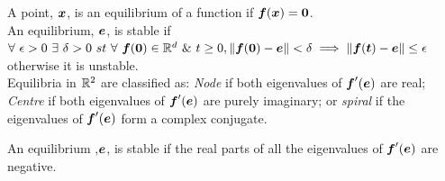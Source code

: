 \documentclass[11pt,a4paper]{article}
\begin{document}
\subtitle{Theory}
A point, $\boldsymbol{x}$, is an equilibrium of a function if $\boldsymbol{f}(\boldsymbol{x}) = \boldsymbol{0}$.\\
An equilibrium, $\boldsymbol{e}$, is stable if\\
\-\hspace{2em} $\forall\ \epsilon > 0\ \exists\ \delta > 0\ st\ \forall\ \boldsymbol{f}(\boldsymbol{0}) \in \mathbb{R}^d\ \&\ t \geq 0, \|\boldsymbol{f}(\boldsymbol{0}) - \boldsymbol{e}\| < \delta \implies \|\boldsymbol{f}(\boldsymbol{t}) - \boldsymbol{e}\| \leq \epsilon$\\
otherwise it is unstable.\\
Equilibria in $\mathbb{R}^2$ are classified as:
\-\hspace{2em} \textit{Node} if both eigenvalues of $\boldsymbol{f}'(\boldsymbol{e})$ are real;
\-\hspace{2em} \textit{Centre} if both eigenvalues of $\boldsymbol{f}'(\boldsymbol{e})$ are purely imaginary; or
\-\hspace{2em} \textit{spiral} if the eigenvalues of $\boldsymbol{f}'(\boldsymbol{e})$ form a complex conjugate.\\

\subtitle{Process}
An equilibrium ,$\boldsymbol{e}$, is stable if the real parts of all the eigenvalues of $\boldsymbol{f}'(\boldsymbol{e})$ are negative.\\
\end{document}

